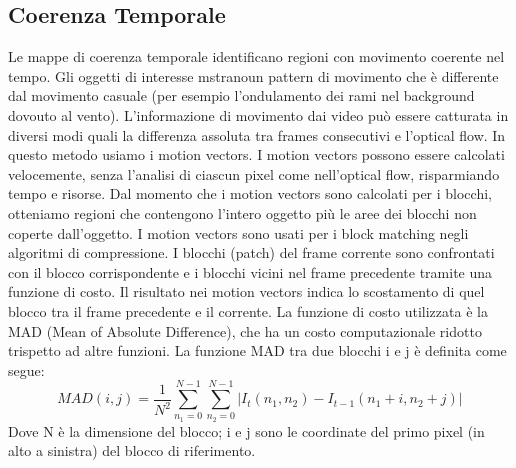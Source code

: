 \documentclass[12pt,oneside]{IEEEtran}
\begin{document}
		\subsection{Coerenza Temporale}
			Le mappe di coerenza temporale identificano regioni con movimento coerente nel tempo. Gli oggetti di interesse mstranoun pattern di movimento che è differente dal movimento casuale (per esempio l'ondulamento dei rami nel background dovouto al vento). L'informazione di movimento dai video può essere catturata in diversi modi quali la differenza assoluta tra frames consecutivi e l'optical flow. In questo metodo usiamo i motion vectors. I motion vectors possono essere calcolati velocemente, senza l'analisi di ciascun pixel come nell'optical flow, risparmiando tempo e risorse. Dal momento che i motion vectors sono calcolati per i blocchi, otteniamo regioni che contengono l'intero oggetto più le aree dei blocchi non coperte dall'oggetto.\newline
			I motion vectors sono usati per i block matching negli algoritmi di compressione. I blocchi (patch) del frame corrente sono confrontati con il blocco corrispondente e i blocchi vicini nel frame precedente tramite una funzione di costo. Il risultato nei motion vectors indica lo scostamento di quel blocco tra il frame precedente e il corrente. La funzione di costo utilizzata è la MAD (Mean of Absolute Difference), che ha un costo computazionale ridotto trispetto ad altre funzioni. La funzione MAD tra due blocchi i e j è definita come segue:
			\begin{equation}
			MAD(i,j) = \frac{1}{N^{2}}\sum_{n_{1}=0}^{N-1}\sum_{n_{2}=0}^{N-1} |I_{t}(n_{1},n_{2})-I_{t-1}(n_{1}+i,n_{2}+j)|
			\end{equation}
			Dove N è la dimensione del blocco; i e j sono le coordinate del primo pixel (in alto a sinistra) del blocco di riferimento.
\end{document}
